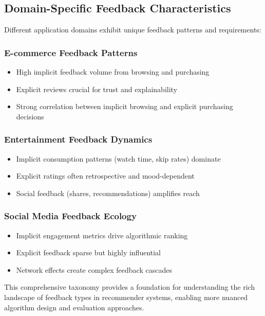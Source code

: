 \subsection{Domain-Specific Feedback Characteristics}

Different application domains exhibit unique feedback patterns and requirements:

\subsubsection{E-commerce Feedback Patterns}
\begin{itemize}
    \item High implicit feedback volume from browsing and purchasing
    \item Explicit reviews crucial for trust and explainability
    \item Strong correlation between implicit browsing and explicit purchasing decisions
\end{itemize}

\subsubsection{Entertainment Feedback Dynamics}
\begin{itemize}
    \item Implicit consumption patterns (watch time, skip rates) dominate
    \item Explicit ratings often retrospective and mood-dependent
    \item Social feedback (shares, recommendations) amplifies reach
\end{itemize}

\subsubsection{Social Media Feedback Ecology}
\begin{itemize}
    \item Implicit engagement metrics drive algorithmic ranking
    \item Explicit feedback sparse but highly influential
    \item Network effects create complex feedback cascades
\end{itemize}

This comprehensive taxonomy provides a foundation for understanding the rich landscape of feedback types in recommender systems, enabling more nuanced algorithm design and evaluation approaches.

